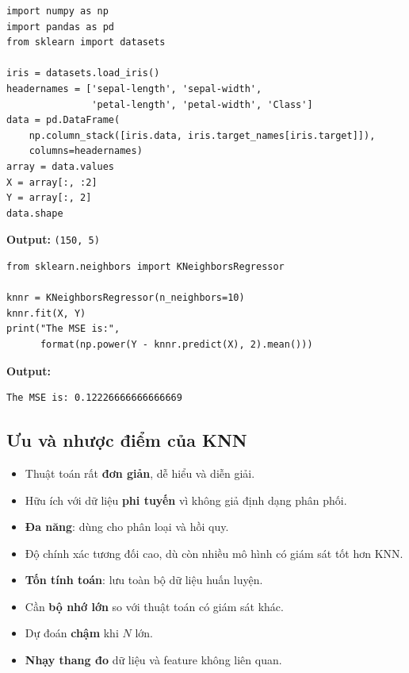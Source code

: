 \begin{vidu}[title={Dữ liệu hai feature, target petal-length}]
\begin{lstlisting}
import numpy as np
import pandas as pd
from sklearn import datasets

iris = datasets.load_iris()
headernames = ['sepal-length', 'sepal-width',
               'petal-length', 'petal-width', 'Class']
data = pd.DataFrame(
    np.column_stack([iris.data, iris.target_names[iris.target]]),
    columns=headernames)
array = data.values
X = array[:, :2]
Y = array[:, 2]
data.shape
\end{lstlisting}

\textbf{Output:} \texttt{(150, 5)}
\end{vidu}

\begin{vidu}[title={KNeighborsRegressor và MSE}]
\begin{lstlisting}
from sklearn.neighbors import KNeighborsRegressor

knnr = KNeighborsRegressor(n_neighbors=10)
knnr.fit(X, Y)
print("The MSE is:",
      format(np.power(Y - knnr.predict(X), 2).mean()))
\end{lstlisting}

\textbf{Output:}
\begin{verbatim}
The MSE is: 0.12226666666666669
\end{verbatim}
\end{vidu}

\subsection{Ưu và nhược điểm của KNN}

\begin{tinhchat}[title={Ưu điểm (Pros)}]
\begin{itemize}
  \item Thuật toán rất \textbf{đơn giản}, dễ hiểu và diễn giải.
  \item Hữu ích với dữ liệu \textbf{phi tuyến} vì không giả định dạng phân phối.
  \item \textbf{Đa năng}: dùng cho phân loại và hồi quy.
  \item Độ chính xác tương đối cao, dù còn nhiều mô hình có giám sát tốt hơn KNN.
\end{itemize}
\end{tinhchat}

\begin{luuy}[title={Nhược điểm (Cons)}]
\begin{itemize}
  \item \textbf{Tốn tính toán}: lưu toàn bộ dữ liệu huấn luyện.
  \item Cần \textbf{bộ nhớ lớn} so với thuật toán có giám sát khác.
  \item Dự đoán \textbf{chậm} khi $N$ lớn.
  \item \textbf{Nhạy thang đo} dữ liệu và feature không liên quan.
\end{itemize}
\end{luuy}

